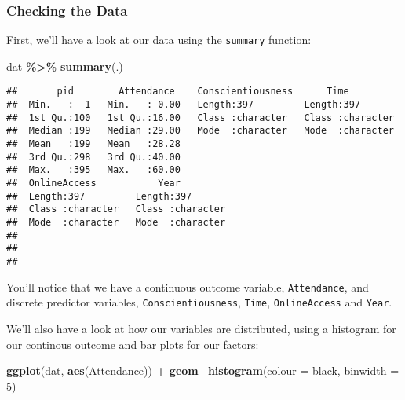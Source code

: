 \documentclass[
]{article}
\newenvironment{Shaded}{\begin{snugshade}}{\end{snugshade}}
\newcommand{\AttributeTok}[1]{\textcolor[rgb]{0.13,0.29,0.53}{#1}}
\newcommand{\DecValTok}[1]{\textcolor[rgb]{0.00,0.00,0.81}{#1}}
\newcommand{\FunctionTok}[1]{\textcolor[rgb]{0.13,0.29,0.53}{\textbf{#1}}}
\newcommand{\NormalTok}[1]{#1}
\newcommand{\SpecialCharTok}[1]{\textcolor[rgb]{0.81,0.36,0.00}{\textbf{#1}}}
\newcommand{\StringTok}[1]{\textcolor[rgb]{0.31,0.60,0.02}{#1}}
\begin{document}
\hypertarget{checking-the-data}{%
\subsubsection{Checking the Data}\label{checking-the-data}}

First, we'll have a look at our data using the \texttt{summary} function:

\begin{Shaded}
\begin{Highlighting}[]
\NormalTok{dat }\SpecialCharTok{\%\textgreater{}\%}
  \FunctionTok{summary}\NormalTok{(.)}
\end{Highlighting}
\end{Shaded}

\begin{verbatim}
##       pid        Attendance    Conscientiousness      Time          
##  Min.   :  1   Min.   : 0.00   Length:397         Length:397        
##  1st Qu.:100   1st Qu.:16.00   Class :character   Class :character  
##  Median :199   Median :29.00   Mode  :character   Mode  :character  
##  Mean   :199   Mean   :28.28                                        
##  3rd Qu.:298   3rd Qu.:40.00                                        
##  Max.   :395   Max.   :60.00                                        
##  OnlineAccess           Year          
##  Length:397         Length:397        
##  Class :character   Class :character  
##  Mode  :character   Mode  :character  
##                                       
##                                       
## 
\end{verbatim}

You'll notice that we have a continuous outcome variable, \texttt{Attendance}, and discrete predictor variables, \texttt{Conscientiousness}, \texttt{Time}, \texttt{OnlineAccess} and \texttt{Year}.

We'll also have a look at how our variables are distributed, using a histogram for our continous outcome and bar plots for our factors:

\begin{Shaded}
\begin{Highlighting}[]
\FunctionTok{ggplot}\NormalTok{(dat, }\FunctionTok{aes}\NormalTok{(Attendance)) }\SpecialCharTok{+} \FunctionTok{geom\_histogram}\NormalTok{(}\AttributeTok{colour =} \StringTok{\textquotesingle{}black\textquotesingle{}}\NormalTok{, }\AttributeTok{binwidth =} \DecValTok{5}\NormalTok{)}
\end{Highlighting}
\end{Shaded}
\end{document}
